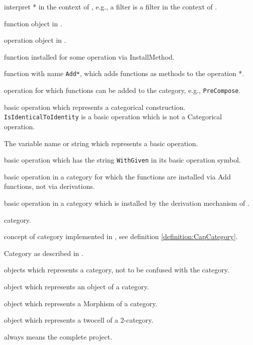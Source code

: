 
\begin{itemize}
 
 \itembold{\GAP *} interpret * in the context of \GAP, e.g., a \GAP filter is
   a filter in the context of \GAP.
 
  function object in \GAP.
 
  operation object in \GAP.
 
  function installed for some operation via InstallMethod.
 
  function with name \texttt{Add*}, which adds functions as methods
   to the operation *.
 
  operation for which functions can be added to the category, e.g., \texttt{PreCompose}.
 
  basic operation which represents a categorical construction. \texttt{IsIdenticalToIdentity}
   is a basic operation which is not a Categorical operation.
 
  The variable name or string which represents a basic operation.
 
  basic operation which has the string \texttt{WithGiven} in its basic operation symbol.
 
  basic operation in a category for which the functions are installed via Add functions, not via
   derivations.
 
  basic operation in a category which is installed by the derivation mechanism of \CapPkg.
 
  \CapPkg category.
 
  concept of category implemented in \CapPkg, see definition \ref{definition:CapCategory}.
 
  Category as described in \cite{MLCWM}.
 
  \GAP objects which represents a \CapPkg category, not to be confused with the \GAP category.
 
  \GAP object which represents an object of a category.
 
  \GAP object which represents a Morphism of a category.
 
  \GAP object which represents a twocell of a 2-category.
 
 \itembold{\CapPkg} always means the complete \CapPkg project.
 
\end{itemize}
